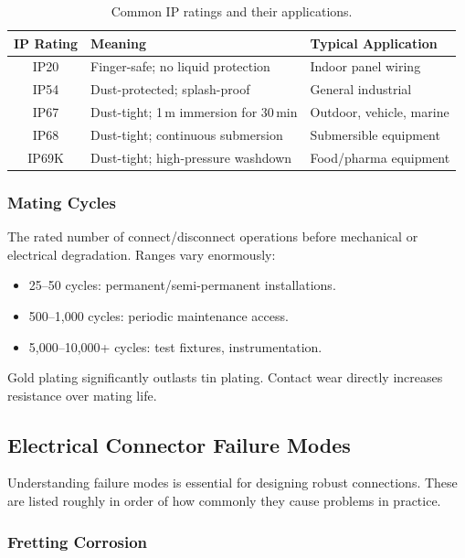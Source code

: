 \documentclass[11pt,letterpaper,twoside,openany]{book}
\begin{document}
\begin{table}[htbp]
\centering
\small
\begin{tabular}{c l l}
  \toprule
  \textbf{IP Rating} & \textbf{Meaning} & \textbf{Typical Application} \\
  \midrule
  IP20 & Finger-safe; no liquid protection & Indoor panel wiring \\
  IP54 & Dust-protected; splash-proof & General industrial \\
  IP67 & Dust-tight; 1\,m immersion for 30\,min & Outdoor, vehicle, marine \\
  IP68 & Dust-tight; continuous submersion & Submersible equipment \\
  IP69K & Dust-tight; high-pressure washdown & Food/pharma equipment \\
  \bottomrule
\end{tabular}
\caption{Common IP ratings and their applications.}
\end{table}

\subsubsection{Mating Cycles}

The rated number of connect/disconnect operations before mechanical or electrical degradation. Ranges vary enormously:
\begin{itemize}[nosep,leftmargin=1.5em]
  \item 25--50 cycles: permanent/semi-permanent installations.
  \item 500--1,000 cycles: periodic maintenance access.
  \item 5,000--10,000+ cycles: test fixtures, instrumentation.
\end{itemize}
Gold plating significantly outlasts tin plating. Contact wear directly increases resistance over mating life.


\subsection{Electrical Connector Failure Modes}
\label{sec:elecfailure}

Understanding failure modes is essential for designing robust connections. These are listed roughly in order of how commonly they cause problems in practice.

\subsubsection{Fretting Corrosion}
\end{document}
